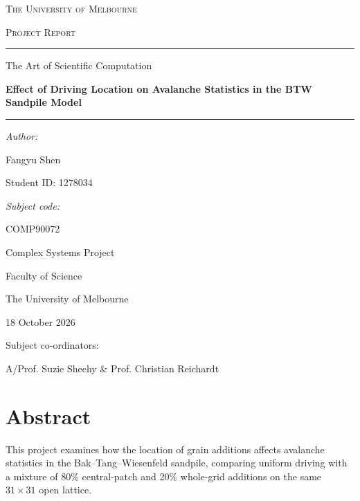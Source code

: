 \documentclass[11pt,a4paper,oneside]{report}
\numberwithin{equation}{chapter}
\begin{document}
\hypersetup{pageanchor=false}
\begin{titlepage}
\thispagestyle{empty}
\centering
\vspace*{12mm}
{\LARGE\scshape The University of Melbourne\par}
\vspace{16mm}
{\Large\scshape Project Report\par}
\vspace{5mm}
\rule{\linewidth}{0.5mm}\par
\vspace{6mm}
{\Large The Art of Scientific Computation\par}
\vspace{7mm}
{\huge\bfseries Effect of Driving Location on Avalanche Statistics in the BTW Sandpile Model\par}
\vspace{6mm}
\rule{\linewidth}{0.5mm}\par
\vspace{10mm}
\begin{minipage}[t]{0.45\textwidth}
\raggedright\large
\textit{Author:}\par Fangyu Shen\par
\vspace{3mm}\normalsize Student ID: 1278034
\end{minipage}\hfill
\begin{minipage}[t]{0.45\textwidth}
\raggedleft\large
\textit{Subject code:}\par COMP90072\par
\vspace{3mm}\normalsize Complex Systems Project
\end{minipage}\par
\vfill
{\large Faculty of Science\par}
{\large The University of Melbourne\par}
\vspace{8mm}
{\large 18 October 2026\par}
\vspace{12mm}
{\normalsize Subject co-ordinators:\par}
\vspace{2mm}
{\normalsize A/Prof. Suzie Sheehy \& Prof. Christian Reichardt\par}
\vspace{10mm}
\end{titlepage}
\hypersetup{pageanchor=true}

\chapter*{Abstract}
This project examines how the location of grain additions affects avalanche statistics in the Bak--Tang--Wiesenfeld sandpile, comparing uniform driving with a mixture of 80\% central-patch and 20\% whole-grid additions on the same $31\times31$ open lattice.
\end{document}
